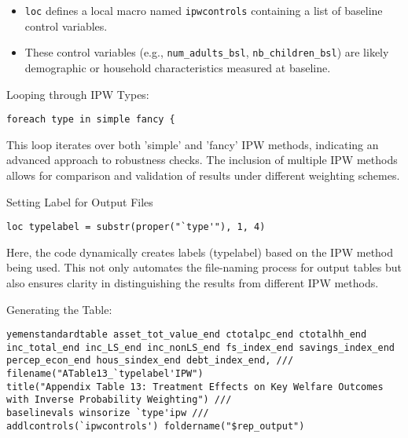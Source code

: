 \documentclass{article}
\begin{document}
\begin{itemize}
    \item \texttt{loc} defines a local macro named \texttt{ipwcontrols} containing a list of baseline control variables.
    \item These control variables (e.g., \texttt{num\_adults\_bsl}, \texttt{nb\_children\_bsl}) are likely demographic or household characteristics measured at baseline.
\end{itemize}


\vspace{0.2cm} Looping through IPW Types:

\begin{mdframed}
\begin{verbatim}
foreach type in simple fancy {
\end{verbatim}
\end{mdframed}
\vspace{0.2cm} This loop iterates over both 'simple' and 'fancy' IPW methods, indicating an advanced approach to robustness checks. The inclusion of multiple IPW methods allows for comparison and validation of results under different weighting schemes.

\vspace{0.3cm}Setting Label for Output Files
\begin{mdframed}
\begin{verbatim}
loc typelabel = substr(proper("`type'"), 1, 4)
\end{verbatim}
\end{mdframed}
\vspace{0.2cm}Here, the code dynamically creates labels (typelabel) based on the IPW method being used. This not only automates the file-naming process for output tables but also ensures clarity in distinguishing the results from different IPW methods.\newline

\vspace{0.2cm}Generating the Table:
\begin{mdframed}
\begin{verbatim}
yemenstandardtable asset_tot_value_end ctotalpc_end ctotalhh_end 
inc_total_end inc_LS_end inc_nonLS_end fs_index_end savings_index_end 
percep_econ_end hous_sindex_end debt_index_end, ///
filename("ATable13_`typelabel'IPW") 
title("Appendix Table 13: Treatment Effects on Key Welfare Outcomes 
with Inverse Probability Weighting") /// 
baselinevals winsorize `type'ipw /// 
addlcontrols(`ipwcontrols') foldername("$rep_output")
\end{verbatim}
\end{mdframed}
\end{document}
